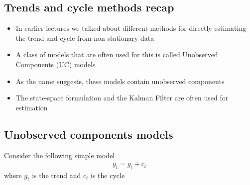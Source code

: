 \documentclass[10pt]{article}
\begin{document}
\subsection{Trends and cycle methods recap}
\begin{itemize}
    \item In earlier lectures we talked about different methods for directly estimating the trend and cycle from non-stationary data 
    \item A class of models that are often used for this is called Unobserved Components (UC) models 
    \item As the name suggests, these models contain unobserved components 
    \item The state-space formulation and the Kalman Filter are often used for estimation 
\end{itemize}
\subsection{Unobserved components models}
Consider the following simple model 
\begin{gather*}
    y_t = g_t + c_t 
\end{gather*}
where $g_t $ is the trend and $c_t $ is the cycle 
\end{document}
